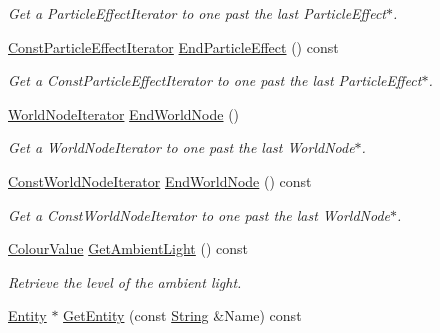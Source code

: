 \begin{DoxyCompactItemize}
\begin{DoxyCompactList}\small\item\em Get a ParticleEffectIterator to one past the last ParticleEffect$\ast$. \item\end{DoxyCompactList}\item 
\hyperlink{classMezzanine_1_1SceneManager_aa99ab0f491a991bda63127519b40b04f}{ConstParticleEffectIterator} \hyperlink{classMezzanine_1_1SceneManager_a27b7aab28a19e1ff92f09828b731877e}{EndParticleEffect} () const 
\begin{DoxyCompactList}\small\item\em Get a ConstParticleEffectIterator to one past the last ParticleEffect$\ast$. \item\end{DoxyCompactList}\item 
\hyperlink{classMezzanine_1_1SceneManager_aa58ecf1d7d283a576509b71133064a27}{WorldNodeIterator} \hyperlink{classMezzanine_1_1SceneManager_a659a0804a38a84627b3d8bec1021e6e3}{EndWorldNode} ()
\begin{DoxyCompactList}\small\item\em Get a WorldNodeIterator to one past the last WorldNode$\ast$. \item\end{DoxyCompactList}\item 
\hyperlink{classMezzanine_1_1SceneManager_a39bddd192e396e2e7cf92bca33b4d03c}{ConstWorldNodeIterator} \hyperlink{classMezzanine_1_1SceneManager_a603612da0ee539bb489184c2895431d8}{EndWorldNode} () const 
\begin{DoxyCompactList}\small\item\em Get a ConstWorldNodeIterator to one past the last WorldNode$\ast$. \item\end{DoxyCompactList}\item 
\hyperlink{classMezzanine_1_1ColourValue}{ColourValue} \hyperlink{classMezzanine_1_1SceneManager_ab23edaf46108b6cd00e64d4338bfc993}{GetAmbientLight} () const 
\begin{DoxyCompactList}\small\item\em Retrieve the level of the ambient light. \item\end{DoxyCompactList}\item 
\hyperlink{classMezzanine_1_1Entity}{Entity} $\ast$ \hyperlink{classMezzanine_1_1SceneManager_a7701c34c00ff4de64e81249953178003}{GetEntity} (const \hyperlink{namespaceMezzanine_acf9fcc130e6ebf08e3d8491aebcf1c86}{String} \&Name) const 

\end{DoxyCompactItemize}
